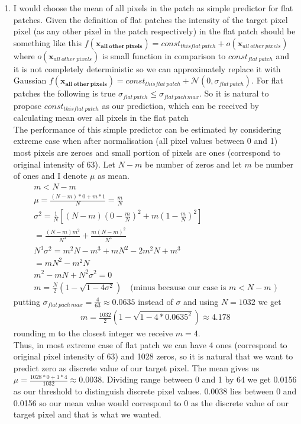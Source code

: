 \documentclass{article}
\newcommand{\vect}[1]{\boldsymbol{#1}} %
\begin{document}
\begin{enumerate}[label=(\alph*)]
				\item
					I would choose the mean of all pixels in the patch as simple predictor for flat patches. Given the definition of flat patches the intensity of the target pixel pixel (as any other pixel in the patch respectively) in the flat patch should be something like this $f(\vect{x_{all\ other\ pixels}}) = const_{this flat\ patch} + o(\vect{x}_{all\ other\ pixels})$ where $o(\vect{x}_{all\ other\ pixels})$ is small function in comparison to $const_{flat\ patch}$ and it is not completely deterministic so we can approximately replace it with Gaussian $f(\vect{x_{all\ other\ pixels}}) = const_{this flat\ patch} + \mathcal{N}(0, \sigma_{flat \, patch} )$. For flat patches the following is true $\sigma_{flat \, patch} \leq \sigma_{flat \, pach \, max}$. So it is natural to propose  $const_{this flat\ patch}$ as our prediction, which can be received by calculating mean over all pixels in the flat patch\\
					The performance of this simple predictor can be estimated by considering extreme case when after normalisation (all pixel values between 0 and 1) most pixels are zeroes and small portion of pixels are ones (correspond to original intensity of 63). Let $N-m$ be number of zeros and let $m$ be number of ones and I denote $\mu$ as mean. 
					\begin{gather*}
						m < N - m
						\\
						\mu = \frac{(N - m) * 0 + m * 1}{N} = \frac{m}{N}
						\\
						\sigma^2 =\frac{1}{N}[(N - m) (0 - \frac{m}{N})^2 + m(1 - \frac{m}{N})^2]
						\\
						= \frac{(N - m)m^2}{N^3} + \frac{m(N - m)^2}{N ^ 3}
						\\
						N^3\sigma^2 = m^2N - m^3 + mN^2 - 2m^2N + m^3 
						\\
						= mN^2-m^2N
						\\
						m^2 - mN + N^2\sigma^2 = 0
						\\
						m = \frac{N}{2}(1 - \sqrt{1 - 4 \sigma ^ 2})\quad\text{(minus because our case is $m < N - m$ )}
					\end{gather*}
					putting $\sigma_{flat \, pach \, max} = \frac{4}{63} \approx 0.0635$ instead of $\sigma$ and using $N = 1032$ we get
					\begin{gather*}
						m = \frac{1032}{2}(1 - \sqrt{1 - 4 * 0.0635^2}) \approx 4.178
					\end{gather*}
					rounding m to the closest integer we receive $m = 4$. \\Thus, in most extreme case of flat patch we can have 4 ones (correspond to original pixel intensity of 63) and 1028 zeros, so it is natural that we want to predict zero as discrete value of our target pixel.  The mean gives us $\mu = \frac{1028 * 0 + 1 * 4} {1032} \approx 0.0038$. Dividing range between 0 and 1 by 64 we get 0.0156 as our threshold to distinguish discrete pixel values. 0.0038 lies between 0 and 0.0156 so our mean value would correspond to 0 as the discrete value of our target pixel and that is what we wanted.

\end{enumerate}
\end{document}
